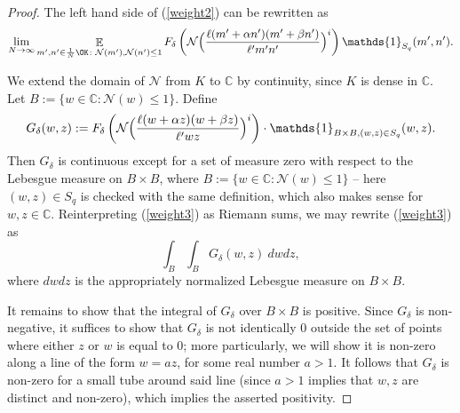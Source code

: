 \documentclass[11pt]{amsart}
\theoremstyle{definition}
\DeclareMathOperator*{\E}{\mathbb{E}}
\newcommand{\C}{{\mathbb C}}
\newcommand{\NN}{{\mathcal N}}
\newcommand{\Q}{{\mathbb Q}}
\newcommand{\FM}[1]{{\color{violet}{{#1}}}}
\newcommand{\WS}[1]{{\color{blue}{{#1}}}}
\begin{document}
\begin{proof}
The left hand side of (\ref{weight2}) can be rewritten as 
\begin{equation}\label{weight3}
\lim_{N \to \infty} \E_{m',n'\in\frac{1}{N}\OK\colon\NN(m'), \NN(n') \leq 1}F_{\delta}\left(\NN\Bigl(\frac{\ell (m'+\alpha n')(m'+\beta n')}{\ell' m'n'}\Bigr)^i \right) \mathds{1}_{S_q}(m',n').
\end{equation}

We extend the domain of $\NN$ from $K$ to $\C$ by continuity, since $K$ is dense in $\C$.
Let $B:=\{ w \in \C : \NN(w) \leq 1\}$. Define
  $$G_{\delta}(w,z):=F_{\delta}\left(\NN\Bigl(\frac{\ell (w+\alpha z)(w+\beta z)}{\ell' wz}\Bigr)^i \right)\cdot\mathds{1}_{B\times B, (w,z) \in S_q}(w,z).$$ 
  Then $G_{\delta}$ is continuous except for a set of measure zero with respect to the Lebesgue measure on $B \times B$, where $B:=\{ w \in \C : \NN(w) \leq 1\}$ -- here $(w,z) \in S_q$ is checked with the same definition, which also makes sense for $w,z \in \C$. Reinterpreting (\ref{weight3}) as Riemann sums, we may rewrite (\ref{weight3}) as   
\[
\int_{B}\int_{B} G_{\delta}(w,z) \ dwdz,
\]
where $dwdz$ is the appropriately normalized Lebesgue measure on $B \times B$. %

 

It remains to show that the integral of $G_{\delta}$ over $B \times B$ is positive. Since $G_{\delta}$ is non-negative, it suffices to show that $G_{\delta}$ is not identically $0$ outside the set of points where either $z$ or $w$ is equal to $0$; more particularly, we will show it is non-zero along a line of the form $w=az$, for some real number $a>1$. It follows that $G_{\delta}$ is non-zero for a small tube around said line (since $a>1$ implies that $w,z$ are distinct and non-zero), which implies the asserted positivity. 


\end{proof}
\end{document}
